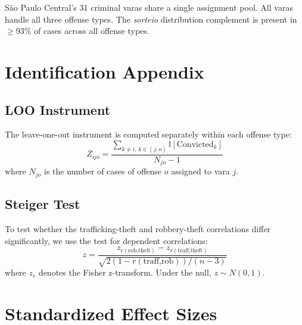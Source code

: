 \documentclass[12pt]{article}
\newcommand{\ind}{\mathbb{I}}
\begin{document}
S\~ao Paulo Central's 31 criminal varas share a single assignment pool. All varas handle all three offense types. The \textit{sorteio} distribution complement is present in $\geq$93\% of cases across all offense types.

\section{Identification Appendix}
\label{app:identification}

\subsection{LOO Instrument}

The leave-one-out instrument is computed separately within each offense type:
\[
Z_{ijo} = \frac{\sum_{k \neq i,\, k \in (j,o)} \ind[\text{Convicted}_k]}{N_{jo} - 1}
\]
where $N_{jo}$ is the number of cases of offense $o$ assigned to vara $j$.

\subsection{Steiger Test}

To test whether the trafficking-theft and robbery-theft correlations differ significantly, we use the \citet{steiger1980} test for dependent correlations:
\[
z = \frac{z_{r(\text{rob,theft})} - z_{r(\text{traff,theft})}}{\sqrt{2(1 - r(\text{traff,rob}))/(n-3)}}
\]
where $z_r$ denotes the Fisher z-transform. Under the null, $z \sim N(0,1)$.

\section{Standardized Effect Sizes}
\label{sec:sde}


\end{document}
